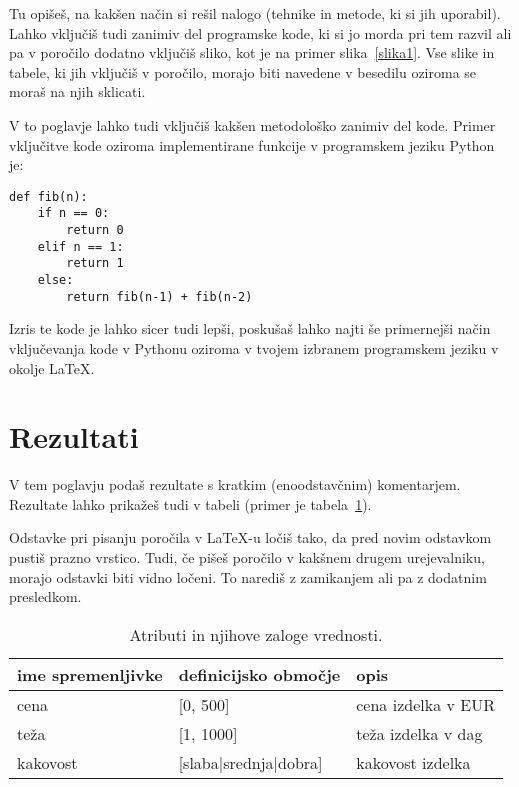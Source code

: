 \documentclass[a4paper,11pt]{article}
\begin{document}
Tu opišeš, na kakšen način si rešil nalogo (tehnike in metode, ki si
jih uporabil). Lahko vključiš tudi zanimiv del programske kode, ki
si jo morda pri tem razvil ali pa v poročilo dodatno vključiš sliko,
kot je na primer slika~\ref{slika1}. Vse slike in tabele, ki jih
vključiš v poročilo, morajo biti navedene v besedilu oziroma se moraš
na njih sklicati.


V to poglavje lahko tudi vključiš kakšen metodološko zanimiv del
kode. Primer vključitve kode oziroma implementirane funkcije v
programskem jeziku Python je:

\begin{lstlisting}
def fib(n):
    if n == 0:
        return 0
    elif n == 1:
        return 1
    else:
        return fib(n-1) + fib(n-2)
\end{lstlisting}

Izris te kode je lahko sicer tudi lepši, poskušaš lahko najti še
primernejši način vključevanja kode v Pythonu oziroma v tvojem izbranem
programskem jeziku v okolje \LaTeX{}.

\section{Rezultati}

V tem poglavju podaš rezultate s kratkim (enoodstavčnim)
komentarjem. Rezultate lahko prikažeš tudi v tabeli (primer je
tabela~\ref{tab1}).

Odstavke pri pisanju poročila v LaTeX-u ločiš tako, da pred novim
odstavkom pustiš prazno vrstico. Tudi, če pišeš poročilo v kakšnem
drugem urejevalniku, morajo odstavki biti vidno ločeni. To narediš z
zamikanjem ali pa z dodatnim presledkom.

\begin{table}[htbp]
\caption{Atributi in njihove zaloge vrednosti.}
\label{tab1}
\begin{center}
\begin{tabular}{llp{3cm}}
\hline
ime spremenljivke & definicijsko območje & opis \\
\hline
cena & [0, 500] & cena izdelka v EUR\\
teža & [1, 1000] & teža izdelka v dag \\
kakovost & [slaba|srednja|dobra] & kakovost izdelka \\
\hline
\end{tabular}
\end{center}
\end{table}
\end{document}
